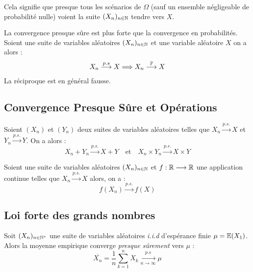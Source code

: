 Cela signifie que presque tous les scénarios de $\Omega$ (sauf un ensemble négligeable de probabilité nulle)
voient la suite $(X_n)_{n \in \mathbb{N}}$ tendre vers $X$. 

\begin{prop}[Comparaison]
    La convergence presque sûre est plus forte que la convergence en probabilités. 
    Soient une suite de variables aléatoires $(X_n)_{n \in \mathbb{N}}$ et une variable aléatoire $X$ on a alors : 
        \[ X_n \overset{p.s}{\longrightarrow} X \Longrightarrow X_n \overset{\mathbb{P}}{\longrightarrow} X \] 
    La réciproque est en général fausse. 
\end{prop}


\subsection{Convergence Presque Sûre et Opérations}

\begin{prop}
    Soient $(X_n)$ et $(Y_n)$ deux suites de variables aléatoires telles que $X_n \overset{p.s.}{\longrightarrow} X$ 
    et $Y_n \overset{p.s.}{\longrightarrow} Y$. On a alors : 
        \[ X_n + Y_n \overset{p.s.}{\longrightarrow} X + Y \quad \text{et} \quad X_n \times Y_n \overset{p.s.}{\longrightarrow} X \times Y \]
\end{prop}

\begin{prop}
    Soient une suite de variables aléatoires $(X_n)_{n \in \mathbb{N}}$ et $f : \mathbb{R} \longrightarrow \mathbb{R}$ une application 
    continue telles que $X_n \overset{p.s.}{\longrightarrow} X$ alors, on a : 
        \[ f(X_n) \overset{p.s.}{\longrightarrow} f(X) \] 
\end{prop}


\subsection{Loi forte des grands nombres}

\begin{theorem}
    Soit $(X_n)_{n \in \mathbb{N}^*}$ une suite de variables aléatoires \emph{i.i.d} d'espérance finie $ \mu = \mathbb{E}(X_1) $. 
    Alors la moyenne empirique converge \emph{presque sûrement} vers $\mu$ : 
        \[ \boxed{\overline{X_n} = \frac{1}{n} \sum_{k=1}^{n} X_k \underset{n \to \infty}{\overset{p.s}{\longrightarrow}} \mu} \] 
\end{theorem}


